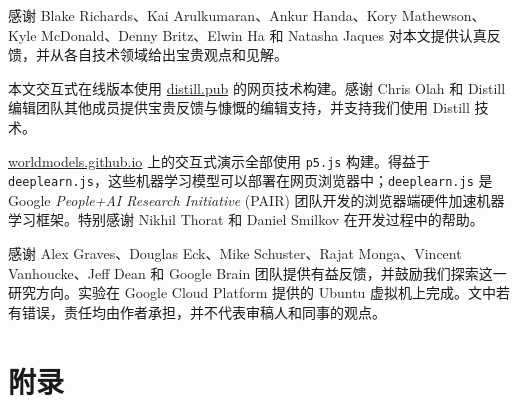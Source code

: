 \documentclass{article}
\begin{document}
感谢 Blake Richards、Kai Arulkumaran、Ankur Handa、Kory Mathewson、Kyle McDonald、Denny Britz、Elwin Ha 和 Natasha Jaques 对本文提供认真反馈，并从各自技术领域给出宝贵观点和见解。

本文交互式在线版本使用 \url{distill.pub} 的网页技术构建。感谢 Chris Olah 和 Distill 编辑团队其他成员提供宝贵反馈与慷慨的编辑支持，并支持我们使用 Distill 技术。

\url{worldmodels.github.io} 上的交互式演示全部使用 \texttt{p5.js} 构建。得益于 \texttt{deeplearn.js}，这些机器学习模型可以部署在网页浏览器中；\texttt{deeplearn.js} 是 Google \textit{People+AI Research Initiative} (PAIR) 团队开发的浏览器端硬件加速机器学习框架。特别感谢 Nikhil Thorat 和 Daniel Smilkov 在开发过程中的帮助。

感谢 Alex Graves、Douglas Eck、Mike Schuster、Rajat Monga、Vincent Vanhoucke、Jeff Dean 和 Google Brain 团队提供有益反馈，并鼓励我们探索这一研究方向。实验在 Google Cloud Platform 提供的 Ubuntu 虚拟机上完成。文中若有错误，责任均由作者承担，并不代表审稿人和同事的观点。

%









\appendix
\section{附录}
\end{document}
